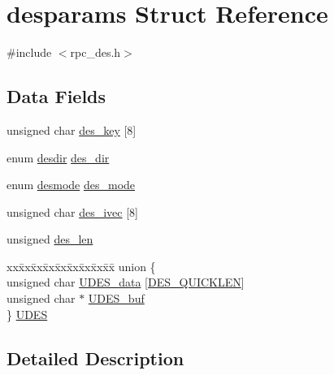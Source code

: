 \hypertarget{structdesparams}{}\section{desparams Struct Reference}
\label{structdesparams}


{\ttfamily \#include $<$rpc\+\_\+des.\+h$>$}

\subsection*{Data Fields}
\begin{DoxyCompactItemize}
\item 
unsigned char \hyperlink{structdesparams_a2236ec74b4cf651a0b604e916f5034a6}{des\+\_\+key} \mbox{[}8\mbox{]}
\item 
enum \hyperlink{rpc__des_8h_a77d581848d3140d21decf45fd1284044}{desdir} \hyperlink{structdesparams_a4afc5696546ba005d064670c15dca7c9}{des\+\_\+dir}
\item 
enum \hyperlink{rpc__des_8h_ae587160a013e5130f62c6ccaaebd6c8d}{desmode} \hyperlink{structdesparams_a808268ae9a3b3cc0b4bf3cbe04a9b173}{des\+\_\+mode}
\item 
unsigned char \hyperlink{structdesparams_a311466c2319dee22041d751ce085cadd}{des\+\_\+ivec} \mbox{[}8\mbox{]}
\item 
unsigned \hyperlink{structdesparams_a11021626f64bb1cdb2fe8bec37fd61bd}{des\+\_\+len}
\item 
\begin{tabbing}
xx\=xx\=xx\=xx\=xx\=xx\=xx\=xx\=xx\=\kill
union \{\\
\>unsigned char \hyperlink{structdesparams_a434f6db8007a05ed486b30550acd2307}{UDES\_data} \mbox{[}\hyperlink{rpc__des_8h_a101de127f1dd078f5973f6e95fb7d520}{DES\_QUICKLEN}\mbox{]}\\
\>unsigned char $\ast$ \hyperlink{structdesparams_afe6b6b5fd0016c0a54f39ce7aa410b64}{UDES\_buf}\\
\} \hyperlink{structdesparams_a08f6caaf21d2d5f365580db69f6f184c}{UDES}\\

\end{tabbing}\end{DoxyCompactItemize}


\subsection{Detailed Description}



